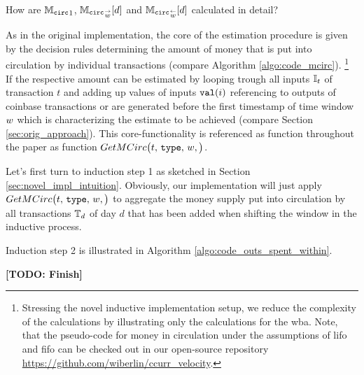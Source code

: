 How are \({\mathbb{M}_{\mathtt{circ}}}_{1}\), \( {{\mathbb{M}_{\mathtt{circ}}}_{\overset{\rightarrow}{{w}}}}[d] \) and \( {{\mathbb{M}_{\mathtt{circ}}}_{\overset{\leftarrow}{{w}}}}[d] \) calculated in detail? %

As in the original implementation, the core of the estimation procedure is given by the decision rules determining the amount of money that is put into circulation by individual transactions (compare Algorithm \ref{algo:code_mcirc}).%
\footnote{Stressing the novel inductive implementation setup, we reduce the complexity of the calculations by illustrating only the calculations for the \ac{wba}. %
Note, that the pseudo-code for money in circulation under the assumptions of \ac{lifo} and \ac{fifo} can be checked out in our open-source repository \url{https://github.com/wiberlin/ccurr_velocity}.
}
If the respective amount can be estimated by looping trough all inputs \({\mathbb{I}}_{t}\) of transaction \(t\) and adding up values of inputs \({\mathtt{val}}(i)\) referencing to outputs of coinbase transactions or are generated before the first timestamp of time window \({w}\) which is characterizing the estimate to be achieved (compare Section \ref{sec:orig_approach}). %
This core-functionality is referenced as function throughout the paper as function \(GetMCirc\bigl(t,\,{\mathtt{type}},\,{w},\bigr)\). %

Let's first turn to induction step 1 as sketched in Section \ref{sec:novel_impl_intuition}. %
Obviously, our implementation will just apply \(GetMCirc\bigl(t,\,{\mathtt{type}},\,{w},\bigr)\) to aggregate the money supply put into circulation by all transactions \({{\mathbb{T}}_{d}}\) of day \(d\) that has been added when shifting the window in the inductive process. %

Induction step 2 is illustrated in Algorithm \ref{algo:code_outs_spent_within}. %

\textbf{[TODO: Finish]}

